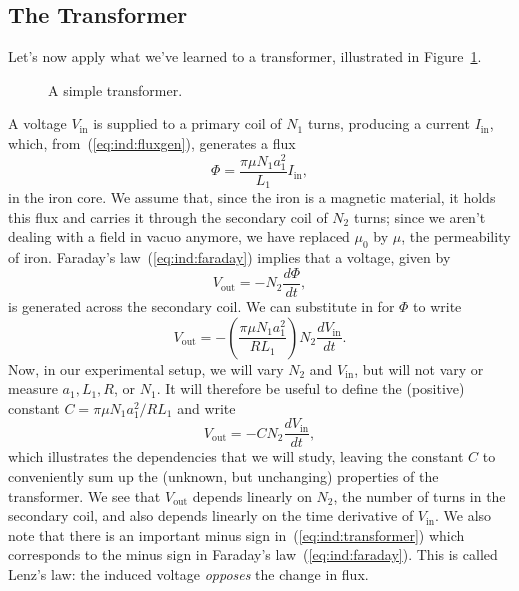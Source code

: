 \subsection{The Transformer}

Let's now apply what we've learned to a transformer, illustrated in 
Figure~\ref{fig:ind:transformer}. 
\begin{figure}[htb]
\centerline{\epsfxsize=10cm }
\caption{A simple transformer.}
\label{fig:ind:transformer}
\end{figure}
A voltage $V_{\mbox{in}}$ is supplied to a primary coil of $N_1$ turns,
producing a current $I_{\mbox{in}}$, which, from~(\ref{eq:ind:fluxgen}),
generates a flux 
$$\Phi= \frac{\pi\mu  N_1 a_1^2}{L_1} I_{\mbox{in}},
$$
in the iron core. We assume that, since the iron is a magnetic material, it
holds this flux and carries it through the secondary coil of $N_2$ turns;
since we aren't dealing with a field in vacuo anymore, we have replaced 
$\mu_0$ by $\mu$, the permeability of iron. 
Faraday's law~(\ref{eq:ind:faraday}) implies that a voltage, given by 
$$V_{\mbox{out}} = - N_2\frac{d\Phi}{dt},$$  
is generated across the secondary coil.  We can substitute in for $\Phi$ to 
write
$$
V_{\mbox{out}} = - \left( \frac{\pi\mu  N_1 a_1^2}{R L_1} \right) N_2 
\frac{d V_{\mbox{in}}}{dt}.
$$
Now, in our experimental setup, we will vary $N_2$ and $V_{\mbox{in}}$, but 
will not vary or measure $a_1,L_1,R$, or $N_1$. It will therefore be useful to 
define the (positive) constant $C=\pi\mu  N_1 a_1^2/RL_1$ and write
\begin{equation}
V_{\mbox{out}}= -C N_2 \frac{d V_{\mbox{in}}}{dt}, \label{eq:ind:transformer}
\end{equation}
which illustrates the dependencies that we will study, leaving the constant $C$ 
to conveniently sum up the (unknown, but unchanging) properties of the 
transformer.  We see that $V_{\mbox{out}}$ depends linearly on $N_2$, the 
number of turns in the secondary coil, and also depends linearly on the
time derivative of $V_{\mbox{in}}$.  We also note that there is an important
minus sign in~(\ref{eq:ind:transformer}) which corresponds to the minus sign
in Faraday's law~(\ref{eq:ind:faraday}). This is called Lenz's law: the induced
voltage {\it opposes} the change in flux.  
  
